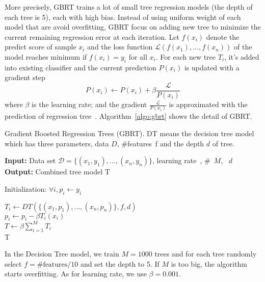 
More precisely, GBRT trains a lot of small tree regression models (the depth of each tree is 5), each with high bias. Instead of using uniform weight of each model that are avoid overfitting, GBRT focus on adding new tree to minimize the current remaining regression error at each iteration. Let $f(x_i)$ denote the predict score of sample $x_i$ and the loss function $\mathcal{L}(f(x_1),...,f(x_n))$ of the model reaches minimum if $f(x_i) = y_i$ for all $x_i$. For each new tree $T_i$, it's added into existing classifier and the current prediction $P(x_i)$ is updated with a gradient step
$$P(x_i) \leftarrow P(x_i) + \beta \frac{\mathcal{L}}{P(x_i)}$$
\noindent where $\beta$ is the learning rate; and the gradient $\frac{\mathcal{L}}{P(x_i)}$ is approximated with the prediction of regression tree~\cite{zheng2007general}. Algorithm~\ref{algo:gbrt} shows the detail of GBRT.

\begin{algorithm}
\caption{Gradient Boosted Regression Trees (GBRT). DT means the decision tree model which has three parameters, data $D$, #features~f and the depth $d$ of tree.}\label{algo:gbrt}
\begin{algorithmic}
\State \textbf{Input:} Data set $\mathcal{D} =\{(x_1, y_1),..., (x_n, y_n)\}$, learning rate~\beta, \#~$M$, ~$d$ \\
\State \textbf{Output:} Combined tree model T

\State Initialization: $\forall i, p_i \leftarrow y_i$

 {
    $T_i \leftarrow DT(\{(x_1, p_1),..., (x_n, p_n)\}, f, d)$ \\
     {
        $p_i \leftarrow p_i - \beta T_i(x_i)$\\
    }
}
$T \leftarrow \beta \sum_{i = 1}^M T_i$\\
\Return T\\
\end{algorithmic}
\end{algorithm}

 In the Decision Tree model, we train $M = 1000$ trees and for each tree randomly select $f = \#\mbox{features} / 10$ and set the depth to 5. If $M$ is too big, the algorithm starts overfitting. As for learning rate, we use $\beta = 0.001$.


